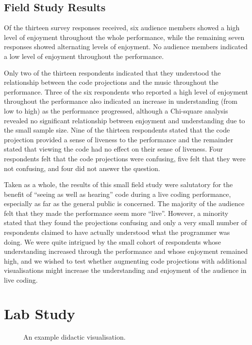 \documentclass{sig-alternate}
\begin{document}
\subsection{Field Study Results}

Of the thirteen survey responses received, six audience members showed
a high level of enjoyment throughout the whole performance, while the
remaining seven responses showed alternating levels of enjoyment. No
audience members indicated a low level of enjoyment throughout the
performance.

Only two of the thirteen respondents indicated that they understood
the relationship between the code projections and the music throughout
the performance. Three of the six respondents who reported a high
level of enjoyment throughout the performance also indicated an
increase in understanding (from low to high) as the performance
progressed, although a Chi-square analysis revealed no significant
relationship between enjoyment and understanding due to the small
sample size. Nine of the thirteen respondents stated that the code
projection provided a sense of liveness to the performance and the
remainder stated that viewing the code had no effect on their sense of
liveness. Four respondents felt that the code projections were
confusing, five felt that they were not confusing, and four did not
answer the question.

Taken as a whole, the results of this small field study were
salutatory for the benefit of ``seeing as well as hearing'' code
during a live coding performance, especially as far as the general
public is concerned. The majority of the audience felt that they made
the performance seem more ``live''. However, a minority stated that
they found the projections confusing and only a very small number of
respondents claimed to have actually understood what the programmer
was doing. We were quite intrigued by the small cohort of respondents
whose understanding increased through the performance and whose
enjoyment remained high, and we wished to test whether augmenting code
projections with additional visualisations might increase the
understanding and enjoyment of the audience in live coding.

\section{Lab Study}

\begin{figure}
\centering
{}
\caption{An example didactic visualisation.}
\label{fig:didactic-visualisation}
\end{figure}
\end{document}
